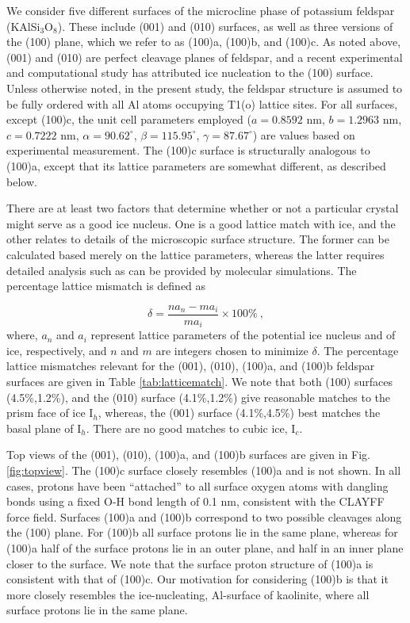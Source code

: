 \documentclass[preprint,aps,prb,floatfix]{revtex4-1}
\begin{document}
We consider five different surfaces of the microcline phase of potassium feldspar (KAlSi$_{3}$O$_{8}$). These include (001) and (010) surfaces, as well as three versions of the (100) plane, which we refer to as (100)a, (100)b, and (100)c. As noted above, (001) and (010) are perfect cleavage planes of feldspar, and a recent experimental and computational study has  attributed ice nucleation to the (100) surface.\cite{KBPC17} Unless otherwise noted, in the present study, the feldspar structure is assumed to be fully ordered with all Al atoms occupying T1(o) lattice sites.\cite{KR87} For all surfaces, except (100)c, the unit cell parameters employed ($a = 0.8592$ nm, $b = 1.2963$ nm, $c = 0.7222$ nm, $\alpha = 90.62^{\circ}$, $\beta = 115.95^{\circ}$, $\gamma = 87.67^{\circ}$) are values based on experimental measurement.\cite{KR87} The (100)c surface is structurally analogous to (100)a, except that its lattice parameters are somewhat different, as described below. 

There are at least two factors that determine whether or not a particular crystal might serve as a good ice nucleus.  One is a good lattice match with ice, and the other relates to details of the microscopic surface structure. The former can be calculated based merely on the lattice parameters,\cite{PK10} whereas the latter requires detailed analysis such as can be provided by molecular simulations.\cite{LHV14,QOHM17,CKSM15,ZBP15a,FD14,CRKSM14,ZBP15b} The percentage lattice mismatch is defined as\cite{PK10} 

\begin{equation}
\delta = \frac{na_{n} - ma_{i}}{ma_{i}} \times 100\%\ ,
\label{eq:mismatch}
\end{equation}
where, $a_{n}$ and $a_{i}$ represent lattice parameters of the potential ice nucleus and of ice, respectively, and $n$ and $m$ are integers chosen to minimize $\delta$. The percentage lattice mismatches relevant for the (001), (010), (100)a, and (100)b feldspar surfaces are given in Table \ref{tab:latticematch}. We note that both (100) surfaces (4.5\%,1.2\%), and the (010) surface (4.1\%,1.2\%) give reasonable matches to the prism face of ice I$_{h}$, whereas, the (001) surface (4.1\%,4.5\%) best matches the basal plane of I$_{h}$. There are no good matches to cubic ice, I$_{c}$. 

Top views of the (001), (010), (100)a, and (100)b surfaces are given in Fig. \ref{fig:topview}. The (100)c surface closely resembles (100)a and is not shown. In all cases, protons have been ``attached'' to all surface oxygen atoms with dangling bonds using a fixed O-H bond length of 0.1 nm, consistent with the CLAYFF force field.\cite{CLK04} Surfaces (100)a and (100)b correspond to two possible cleavages along the (100) plane. For (100)b all surface protons lie in the same plane, whereas for (100)a half of the surface protons lie in an outer plane, and half in an inner plane closer to the surface. We note that the surface proton structure of (100)a is consistent with that of (100)c.\cite{KBPC17} Our motivation for considering (100)b is that it more closely resembles the ice-nucleating, Al-surface of kaolinite, where all surface protons lie in the same plane.\cite{ZBP15b}
\end{document}
